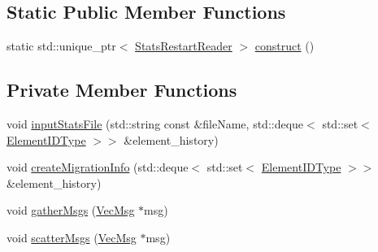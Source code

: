 \subsection*{Static Public Member Functions}
\begin{DoxyCompactItemize}
\item 
static std\+::unique\+\_\+ptr$<$ \hyperlink{structvt_1_1vrt_1_1collection_1_1balance_1_1_stats_restart_reader}{Stats\+Restart\+Reader} $>$ \hyperlink{structvt_1_1vrt_1_1collection_1_1balance_1_1_stats_restart_reader_a5030b1f5ce0f67af68ca4ac43d7f3bd9}{construct} ()
\end{DoxyCompactItemize}
\subsection*{Private Member Functions}
\begin{DoxyCompactItemize}
\item 
void \hyperlink{structvt_1_1vrt_1_1collection_1_1balance_1_1_stats_restart_reader_af2ef6b8e0e99d04ed21b6fa378819a2f}{input\+Stats\+File} (std\+::string const \&file\+Name, std\+::deque$<$ std\+::set$<$ \hyperlink{namespacevt_1_1vrt_1_1collection_1_1balance_a14c8d2c972f2913aa3f1636e5be0a120}{Element\+I\+D\+Type} $>$$>$ \&element\+\_\+history)
\item 
void \hyperlink{structvt_1_1vrt_1_1collection_1_1balance_1_1_stats_restart_reader_a357379003c1041ddcfba382bb9393129}{create\+Migration\+Info} (std\+::deque$<$ std\+::set$<$ \hyperlink{namespacevt_1_1vrt_1_1collection_1_1balance_a14c8d2c972f2913aa3f1636e5be0a120}{Element\+I\+D\+Type} $>$$>$ \&element\+\_\+history)
\item 
void \hyperlink{structvt_1_1vrt_1_1collection_1_1balance_1_1_stats_restart_reader_a7c0adbbe2dd2b7b3f0f42687abe3211e}{gather\+Msgs} (\hyperlink{structvt_1_1vrt_1_1collection_1_1balance_1_1_stats_restart_reader_a7e2a74977e595242bf3abb6c83b7e27b}{Vec\+Msg} $\ast$msg)
\item 
void \hyperlink{structvt_1_1vrt_1_1collection_1_1balance_1_1_stats_restart_reader_a6c355461ab40a4efe65ff3d1351a66d1}{scatter\+Msgs} (\hyperlink{structvt_1_1vrt_1_1collection_1_1balance_1_1_stats_restart_reader_a7e2a74977e595242bf3abb6c83b7e27b}{Vec\+Msg} $\ast$msg)
\end{DoxyCompactItemize}
